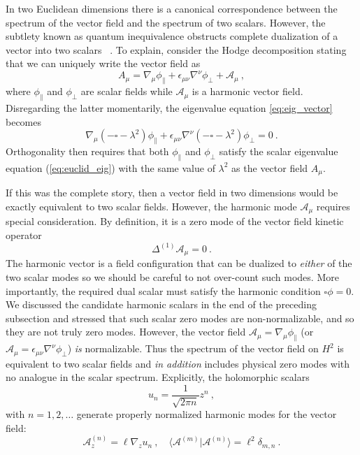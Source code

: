 \documentclass[12pt]{article}
\begin{document}
In two Euclidean dimensions there is a canonical correspondence between the spectrum of the vector field and the spectrum of two scalars. 
However, the subtlety known as quantum inequivalence obstructs complete dualization of a vector into two scalars ~\cite{1980PhLB...94..179D,
Bastianelli:2005vk,Bastianelli:2005uy,Larsen:2015aia}. To explain, consider the Hodge decomposition stating that we can uniquely write the vector field as
%
\begin{equation}
	A_\mu = \nabla_\mu \phi_{\parallel} + \epsilon_{\mu\nu} \nabla^\nu \phi_\perp + \mathcal{A}_\mu~,
\end{equation}
%
where $\phi_{\parallel}$ and $\phi_{\perp}$ are scalar fields while $\mathcal{A}_\mu$ is a harmonic vector field.  Disregarding the latter momentarily, 
the eigenvalue equation \eqref{eq:eig_vector} becomes
%
\begin{equation}
	\nabla_\mu \left(-\square - \lambda^2 \right)\phi_{\parallel} + \epsilon_{\mu\nu}\nabla^\nu \left(-\square - \lambda^2 \right) \phi_{\perp} = 0~.
\end{equation}
Orthogonality then requires that both $\phi_{\parallel}$ and $\phi_\perp$ satisfy the scalar eigenvalue equation (\ref{eq:euclid_eig}) with the same value of $\lambda^2$
as the vector field $A_\mu$. 

%
If this was the complete story, then a vector field in two dimensions would be exactly equivalent to two scalar fields. However, the 
harmonic mode $\mathcal{A}_\mu$ requires special consideration. By definition, it is a zero mode of the vector field kinetic operator
%
\begin{equation}
	\Delta^{(1)}\mathcal{A}_\mu = 0~.
\end{equation}
%
The harmonic vector is a field configuration that can be dualized to \emph{either} of the two scalar modes so we should be careful to not over-count such modes. More importantly, the required dual scalar must satisfy the harmonic condition $\square \phi = 0$. We discussed the candidate harmonic scalars in the end of the preceding subsection and stressed that 
such scalar zero modes are non-normalizable, and so they are not truly zero modes. However, the vector field $\mathcal{A}_\mu = \nabla_\mu \phi_{\parallel}$ (or $\mathcal{A}_\mu = \epsilon_{\mu\nu}\nabla^\nu\phi_{\perp}$) \emph{is} normalizable.  Thus the spectrum of the vector field on $H^2$ is equivalent to two scalar fields and \emph{in addition} includes physical zero modes with no analogue in the scalar spectrum. Explicitly, the holomorphic scalars
%
\begin{equation}
	u_n = \frac{1}{\sqrt{2\pi n}}z^n~,
\end{equation}
%
with $n = 1,2,\ldots$ generate properly normalized harmonic modes for the vector field:
%
\begin{equation}
	\mathcal{A}_z^{(n)} = \ell\nabla_z u_n~, \quad \langle \mathcal{A}^{(m)} | \mathcal{A}^{(n)} \rangle= \ell^2 \delta_{m,n}~.
\label{eq:harmonic_basis}
\end{equation}
%
\end{document}
